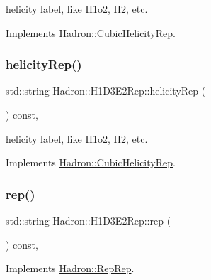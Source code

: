 helicity label, like H1o2, H2, etc. 

Implements \mbox{\hyperlink{structHadron_1_1CubicHelicityRep_af1096946b7470edf0a55451cc662f231}{Hadron\+::\+Cubic\+Helicity\+Rep}}.

\mbox{\label{structHadron_1_1H1D3E2Rep_a9b18f2d67ec482a4a8d2adc6287a1571}} 
\subsubsection{\texorpdfstring{helicityRep()}{helicityRep()}\hspace{0.1cm}{\footnotesize\ttfamily [3/3]}}
{\footnotesize\ttfamily std\+::string Hadron\+::\+H1\+D3\+E2\+Rep\+::helicity\+Rep (\begin{DoxyParamCaption}{ }\end{DoxyParamCaption}) const\hspace{0.3cm}{\ttfamily [inline]}, {\ttfamily [virtual]}}

helicity label, like H1o2, H2, etc. 

Implements \mbox{\hyperlink{structHadron_1_1CubicHelicityRep_af1096946b7470edf0a55451cc662f231}{Hadron\+::\+Cubic\+Helicity\+Rep}}.

\mbox{\label{structHadron_1_1H1D3E2Rep_ace031c7809b792a43f41c55b6b45c355}} 
\subsubsection{\texorpdfstring{rep()}{rep()}\hspace{0.1cm}{\footnotesize\ttfamily [1/5]}}
{\footnotesize\ttfamily std\+::string Hadron\+::\+H1\+D3\+E2\+Rep\+::rep (\begin{DoxyParamCaption}{ }\end{DoxyParamCaption}) const\hspace{0.3cm}{\ttfamily [inline]}, {\ttfamily [virtual]}}



Implements \mbox{\hyperlink{structHadron_1_1RepRep_ab3213025f6de249f7095892109575fde}{Hadron\+::\+Rep\+Rep}}.

\mbox{\label{structHadron_1_1H1D3E2Rep_ace031c7809b792a43f41c55b6b45c355}} 
